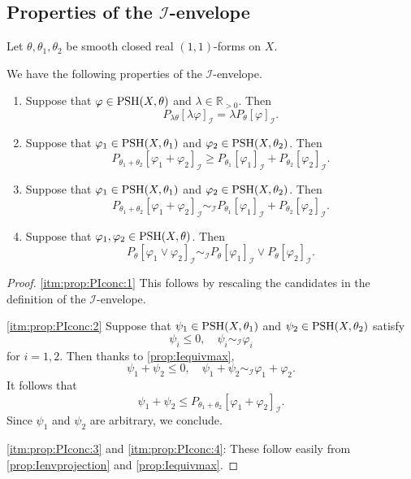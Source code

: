 \subsection{Properties of the \texorpdfstring{$\mathcal{I}$}{I}-envelope}
\label{subsec:Ienv_prop}
Let $\theta,\theta_1,\theta_2$ be smooth closed real $(1,1)$-forms on $X$.

We have the following properties of the $\mathcal{I}$-envelope.
\begin{proposition}\label{prop:PIconc}
    \leavevmode
    \begin{enumerate}
        \item\label{itm:prop:PIconc:1} Suppose that $\varphi\in \mathrm{PSH}(X,\theta)$ and $\lambda\in \mathbb{R}_{>0}$. Then
            \[
                P_{\lambda\theta}[\lambda\varphi]_{\mathcal{I}}=\lambda P_{\theta}[\varphi]_{\mathcal{I}}.
            \]
        \item\label{itm:prop:PIconc:2} Suppose that $\varphi_1\in \mathrm{PSH}(X,\theta_1)$ and $\varphi_2\in \mathrm{PSH}(X,\theta_2)$. Then
            \[
                P_{\theta_1+\theta_2}[\varphi_1+\varphi_2]_{\mathcal{I}}\geq P_{\theta_1}[\varphi_1]_{\mathcal{I}}+P_{\theta_2}[\varphi_2]_{\mathcal{I}}.
            \]
        \item\label{itm:prop:PIconc:3}
        Suppose that $\varphi_1\in \mathrm{PSH}(X,\theta_1)$ and $\varphi_2\in \mathrm{PSH}(X,\theta_2)$. Then
            \[
                P_{\theta_1+\theta_2}[\varphi_1+\varphi_2]_{\mathcal{I}}\sim_{\mathcal{I}} P_{\theta_1}[\varphi_1]_{\mathcal{I}}+P_{\theta_2}[\varphi_2]_{\mathcal{I}}.
            \]
        \item\label{itm:prop:PIconc:4}
            Suppose that $\varphi_1,\varphi_2\in \mathrm{PSH}(X,\theta)$. Then
                \[
                    P_{\theta}[\varphi_1\lor \varphi_2]_{\mathcal{I}}\sim_{\mathcal{I}} P_{\theta}[\varphi_1]_{\mathcal{I}}\lor P_{\theta}[\varphi_2]_{\mathcal{I}}.
                \]
    \end{enumerate}
\end{proposition}
\begin{proof}
    \ref{itm:prop:PIconc:1} This follows by rescaling the candidates in the definition of the $\mathcal{I}$-envelope.

    \ref{itm:prop:PIconc:2} Suppose that $\psi_1\in \mathrm{PSH}(X,\theta_1)$ and $\psi_2\in \mathrm{PSH}(X,\theta_2)$ satisfy
    \[
        \psi_i\leq 0,\quad \psi_i \sim_{\mathcal{I}} \varphi_i
    \]
    for $i=1,2$. Then thanks to \cref{prop:Iequivmax},
    \[
        \psi_1+\psi_2\leq 0,\quad \psi_1+\psi_2 \sim_{\mathcal{I}} \varphi_1+\varphi_2.
    \]
    It follows that
    \[
        \psi_1+\psi_2\leq P_{\theta_1+\theta_2}[\varphi_1+\varphi_2]_{\mathcal{I}}.
    \]
    Since $\psi_1$ and $\psi_2$ are arbitrary, we conclude.

    \ref{itm:prop:PIconc:3} and \ref{itm:prop:PIconc:4}: These follow easily from \cref{prop:Ienvprojection} and \cref{prop:Iequivmax}.
\end{proof}

